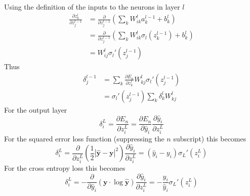 \documentclass{article}
\begin{document}
Using the definition of the inputs to the neurons in layer $l$
\begin{equation}
\begin{split}
\frac{\partial z_k^l}{\partial z_j^{l-1}} &= \frac{\partial }{\partial z_j^{l-1}} \left(\sum_k W_{ik}^l a_k^{l-1} + b_k^l \right) \\
&= \frac{\partial }{\partial z_j^{l-1}} \left(\sum_k W_{ik}^l \sigma_l (z_k^{l-1}) + b_k^l \right) \\
&=W_{ij}^l \sigma_l '(z_j^{l-1}) 
\end{split}
\end{equation}
Thus
\begin{equation}
\begin{split}
\delta_j^{l-1} 
&= \sum_k \frac{\partial E_n}{\partial z_k^l } W_{kj}^l \sigma_l '(z_j^{l-1}) \\
&= \sigma_l '(z_j^{l-1}) \sum_k \delta_k^l W_{kj}^l 
\end{split}
\end{equation}
For the output layer
\begin{equation}
\delta_i^{L} 
= \frac{\partial E_n}{\partial z_i^{L}} 
= \frac{\partial E_n}{\partial \hat{y}_i} \frac{\partial \hat{y}_i}{\partial z_i^{L}}  
\end{equation}
For the squared error loss function (suppressing the $n$ subscript) this becomes
\begin{equation}
\delta_i^{L} 
= \frac{\partial}{\partial z_i^L} \left(\frac{1}{2} \left |\hat{\textbf{y}} - \textbf{y} \right|^2 \right) \frac{\partial \hat{y}_i}{\partial z_i^{L}}
= \left( \hat{y}_i - y_i \right) \sigma_L'(z_i^L)
\end{equation}
For the cross entropy loss this becomes
\begin{equation}
\delta_i^{L} 
= - \frac{\partial}{\partial \hat{y}_i} \left(\textbf{y} \cdot \log{\hat{\textbf{y}}} \right) \frac{\partial \hat{y}_i}{\partial z_i^{L}}
= -\frac{y_i}{\hat{y}_i} \sigma_L'(z_i^L)
\end{equation}
\end{document}
